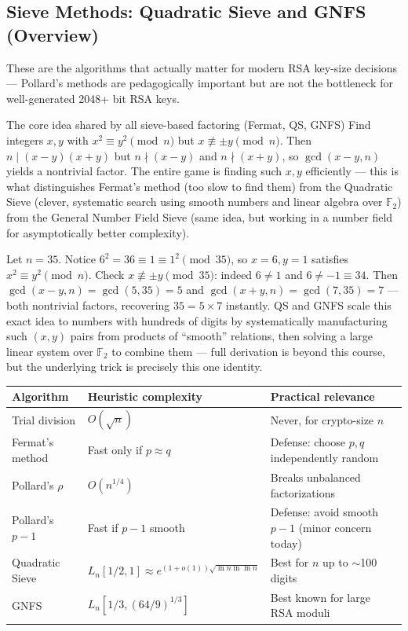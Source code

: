 \subsection{Sieve Methods: Quadratic Sieve and GNFS (Overview)}

These are the algorithms that actually matter for modern RSA key-size decisions — Pollard's methods are pedagogically important but are not the bottleneck for well-generated 2048+ bit RSA keys.

\begin{keybox}{The core idea shared by all sieve-based factoring (Fermat, QS, GNFS)}
Find integers $x, y$ with $x^2 \equiv y^2 \pmod n$ but $x \not\equiv \pm y \pmod n$. Then $n \mid (x-y)(x+y)$ but $n \nmid (x-y)$ and $n \nmid (x+y)$, so $\gcd(x-y, n)$ yields a nontrivial factor. The entire game is finding such $x, y$ efficiently — this is what distinguishes Fermat's method (too slow to find them) from the Quadratic Sieve (clever, systematic search using smooth numbers and linear algebra over $\mathbb{F}_2$) from the General Number Field Sieve (same idea, but working in a number field for asymptotically better complexity).
\end{keybox}

\begin{example}
Let $n = 35$. Notice $6^2 = 36 \equiv 1 \equiv 1^2 \pmod{35}$, so $x=6, y=1$ satisfies $x^2 \equiv y^2 \pmod n$. Check $x \not\equiv \pm y \pmod{35}$: indeed $6 \ne 1$ and $6 \ne -1 \equiv 34$. Then $\gcd(x-y, n) = \gcd(5,35) = 5$ and $\gcd(x+y,n) = \gcd(7,35)=7$ — both nontrivial factors, recovering $35 = 5 \times 7$ instantly. QS and GNFS scale this exact idea to numbers with hundreds of digits by systematically manufacturing such $(x,y)$ pairs from products of ``smooth'' relations, then solving a large linear system over $\mathbb{F}_2$ to combine them — full derivation is beyond this course, but the underlying trick is precisely this one identity.
\end{example}

\begin{center}
\begin{tabular}{lll}
\toprule
\textbf{Algorithm} & \textbf{Heuristic complexity} & \textbf{Practical relevance} \\
\midrule
Trial division & $O(\sqrt{n})$ & Never, for crypto-size $n$ \\
Fermat's method & Fast only if $p \approx q$ & Defense: choose $p,q$ independently random \\
Pollard's $\rho$ & $O(n^{1/4})$ & Breaks unbalanced factorizations \\
Pollard's $p-1$ & Fast if $p-1$ smooth & Defense: avoid smooth $p-1$ (minor concern today) \\
Quadratic Sieve & $L_n[1/2, 1] \approx e^{(1+o(1))\sqrt{\ln n \ln \ln n}}$ & Best for $n$ up to $\sim$100 digits \\
GNFS & $L_n[1/3, (64/9)^{1/3}]$ & Best known for large RSA moduli \\
\bottomrule
\end{tabular}
\end{center}


